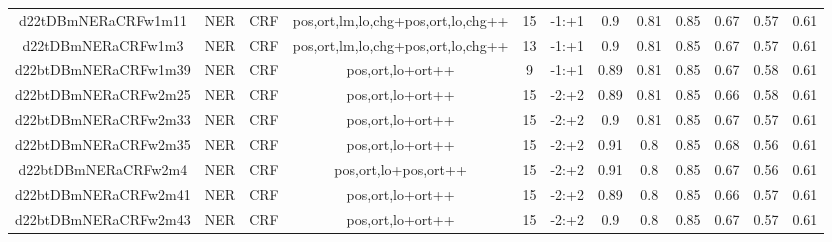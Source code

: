 \documentclass[a4paper]{article}
\begin{document}
\begin{landscape}
\begin{center}
\begin{tabular}{ |c|c|c|c|c|c|c|c|c|c|c|c|}
 		\small{ d22tDBmNERaCRFw1m11 } & NER & CRF & pos,ort,lm,lo,chg+pos,ort,lo,chg++  &  15 &  -1:+1  &  0.9 & 0.81 & 0.85  &  0.67 & 0.57 & 0.61 \\
 		

 	
 
 	
 		
 		\small{ d22tDBmNERaCRFw1m3 } & NER & CRF & pos,ort,lm,lo,chg+pos,ort,lo,chg++  &  13 &  -1:+1  &  0.9 & 0.81 & 0.85  &  0.67 & 0.57 & 0.61 \\
 		

 	
 
 	
 		
 		\small{ d22btDBmNERaCRFw1m39 } & NER & CRF & pos,ort,lo+ort++  &  9 &  -1:+1  &  0.89 & 0.81 & 0.85  &  0.67 & 0.58 & 0.61 \\
 		

 	
 
 	
 		
 		\small{ d22btDBmNERaCRFw2m25 } & NER & CRF & pos,ort,lo+ort++  &  15 &  -2:+2  &  0.89 & 0.81 & 0.85  &  0.66 & 0.58 & 0.61 \\
 		

 	
 
 	
 		
 		\small{ d22btDBmNERaCRFw2m33 } & NER & CRF & pos,ort,lo+ort++  &  15 &  -2:+2  &  0.9 & 0.81 & 0.85  &  0.67 & 0.57 & 0.61 \\
 		

 	
 
 	
 		
 		\small{ d22btDBmNERaCRFw2m35 } & NER & CRF & pos,ort,lo+ort++  &  15 &  -2:+2  &  0.91 & 0.8 & 0.85  &  0.68 & 0.56 & 0.61 \\
 		

 	
 
 	
 		
 		\small{ d22btDBmNERaCRFw2m4 } & NER & CRF & pos,ort,lo+pos,ort++  &  15 &  -2:+2  &  0.91 & 0.8 & 0.85  &  0.67 & 0.56 & 0.61 \\
 		

 	
 
 	
 		
 		\small{ d22btDBmNERaCRFw2m41 } & NER & CRF & pos,ort,lo+ort++  &  15 &  -2:+2  &  0.89 & 0.8 & 0.85  &  0.66 & 0.57 & 0.61 \\
 		

 	
 
 	
 		
 		\small{ d22btDBmNERaCRFw2m43 } & NER & CRF & pos,ort,lo+ort++  &  15 &  -2:+2  &  0.9 & 0.8 & 0.85  &  0.67 & 0.57 & 0.61 \\
 		


\end{tabular}
\end{center}
\end{landscape}
\end{document}
